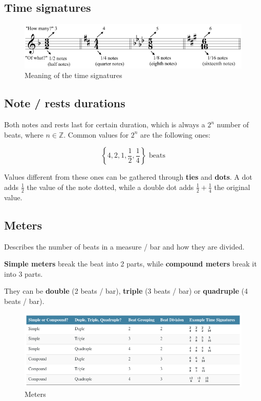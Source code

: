 \subsection{Time signatures}

\begin{figure}[h]
    \begin{center}
        \includegraphics[width=1\textwidth]{img/timesignature}
        \caption{Meaning of the time signatures}
    \end{center}
\end{figure}

\subsection{Note / rests durations}
Both notes and rests last for certain duration, which is always a $2^n$ number of beats, where $n \in \mathbb Z$. Common values for $2^n$ are the following ones:

$$\left\{4,2,1,\frac{1}{2}, \frac{1}{4}\right\} \text{ beats}$$

Values different from these ones can be gathered through \textbf{ties} and \textbf{dots}. A dot adds $\frac{1}{2}$ the value of the note dotted, while a double dot adds $\frac{1}{2} + \frac{1}{4}$ the original value.

\subsection{Meters}
\begin{definition}[Meter]
    Describes the number of beats in a measure / bar and how they are divided.
\end{definition}

\textbf{Simple meters} break the beat into 2 parts, while \textbf{compound meters} break it into 3 parts.

They can be \textbf{double} (2 beats / bar), \textbf{triple} (3 beats / bar) or \textbf{quadruple} (4 beats / bar).

\begin{figure}[h]
    \begin{center}
        \includegraphics[width=1\textwidth]{img/meters}
        \caption{Meters}
    \end{center}
\end{figure}

